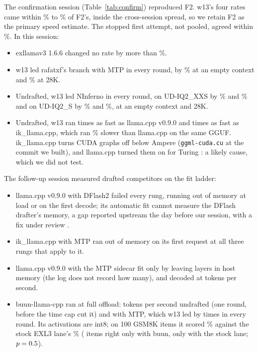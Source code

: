 \documentclass[11pt,letterpaper]{article}
\begin{document}
The confirmation session (Table~\ref{tab:confirm}) reproduced F2. w13's four
rates came within \PeCfFtwoMin\% to \PeCfFtwoMax\% of F2's, inside the
cross-session spread, so we retain F2 as the primary speed estimate. The stopped first attempt, not
pooled, agreed within \PeCfStopMax\%. In this session:
\begin{itemize}\setlength{\itemsep}{1pt}
\item exllamav3 1.6.6 changed no rate by more than \PeCfSixMax\%.
\item w13 led rafatxf's branch with MTP in every round, by \PeCfPRafZero\% at
an empty context and \PeCfPRafDeep\% at 28K.
\item Undrafted, w13 led NInferno in every round, on UD-IQ2\_XXS by
\PeCfPNifXxsZero\% and \PeCfPNifXxsDeep\% and on UD-IQ2\_S by
\PeCfPNifSZero\% and \PeCfPNifSDeep\%, at an empty context and 28K.
\item Undrafted, w13 ran \PeCfXLcppZero{} times as fast as llama.cpp v0.9.0 and
\PeCfXIkXxsZero{} times as fast as ik\_llama.cpp, which ran \PeCfIkVsLcpp\% slower
than llama.cpp on the same GGUF. ik\_llama.cpp turns CUDA graphs off below
Ampere (\texttt{ggml-cuda.cu} at the commit we built), and llama.cpp turned
them on for Turing \citep{llamacpp25749}: a likely cause, which we did not
test.
\end{itemize}
The follow-up session measured drafted competitors on the fit ladder:
\begin{itemize}\setlength{\itemsep}{1pt}
\item llama.cpp v0.9.0 with DFlash2 failed every rung, running out of
memory at load or on the first decode; its automatic fit cannot measure the
DFlash drafter's memory, a gap reported upstream the day before our session,
with a fix under review \citep{llamacpp31643}.
\item ik\_llama.cpp with MTP ran out of memory on its first request at all
three rungs that apply to it.
\item llama.cpp v0.9.0 with the MTP sidecar fit only by leaving layers in
host memory (the log does not record how many), and decoded at
\PeCfLcppMtpZero{} tokens per second.
\item buun-llama-cpp ran at full offload: \PeCfBuunNdZero{} tokens per second
undrafted (one round, before the time cap cut it) and \PeCfBuunMtpZero{} with
MTP, which w13 led by \PeCfXBuunMtpZero{} times in every round. Its
activations are int8; on 100 GSM8K items it scored \PeCfBuunAcc\% against the
stock EXL3 lane's \PeCfBuunRefAcc\% (\PeCfBuunTen{} items right only with
buun, \PeCfBuunOtt{} only with the stock lane; $p=0.5$).
\end{itemize}
\end{document}
